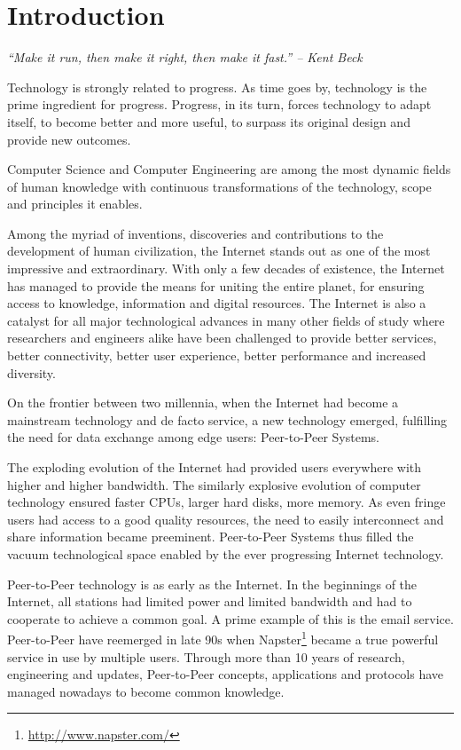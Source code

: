 
\chapter{Introduction}
\label{chapter:intro}

\textit{``Make it run, then make it right, then make it fast.'' -- Kent Beck}

Technology is strongly related to progress. As time goes by, technology is the
prime ingredient for progress. Progress, in its turn, forces technology to
adapt itself, to become better and more useful, to surpass its original design
and provide new outcomes.

Computer Science and Computer Engineering are among the most dynamic fields of
human knowledge with continuous transformations of the technology, scope and
principles it enables.

Among the myriad of inventions, discoveries and contributions to the
development of human civilization, the Internet stands out as one of the
most impressive and extraordinary. With only a few decades of existence, the
Internet has managed to provide the means for uniting the entire planet, for
ensuring access to knowledge, information and digital resources. The Internet
is also a catalyst for all major technological advances in many other fields
of study where researchers and engineers alike have been challenged to provide
better services, better connectivity, better user experience, better
performance and increased diversity.

On the frontier between two millennia, when the Internet had become a
mainstream technology and de facto service, a new technology emerged,
fulfilling the need for data exchange among edge users: Peer-to-Peer Systems.

The exploding evolution of the Internet had provided users everywhere with
higher and higher bandwidth. The similarly explosive evolution of computer
technology ensured faster CPUs, larger hard disks, more memory. As even fringe
users had access to a good quality resources, the need to easily interconnect
and share information became preeminent. Peer-to-Peer Systems thus filled the
vacuum technological space enabled by the ever progressing Internet
technology.

Peer-to-Peer technology is as early as the Internet. In the beginnings of the
Internet, all stations had limited power and limited bandwidth and had to
cooperate to achieve a common goal. A prime example of this is the email
service. Peer-to-Peer have reemerged in late 90s when
Napster\footnote{\url{http://www.napster.com/}}
became a true powerful service in use by multiple users. Through more than 10
years of research, engineering and updates, Peer-to-Peer concepts,
applications and protocols have managed nowadays to become common knowledge.

